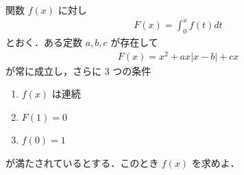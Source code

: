 \documentclass[../../main.tex]{subfiles}
\begin{document}
関数 $f(x)$ に対し
\begin{align}
  F(x) = \int_0^x f(t)dt
\end{align}
とおく．ある定数 $a, b, c$ が存在して
\begin{align}
  F(x) = x^2 + ax|x-b| + cx
\end{align}
が常に成立し，さらに $3$ つの条件
\begin{enumerate}
  \item[(i)] $f(x)$ は連続
  \item[(ii)] $F(1) = 0$
  \item[(iii)] $f(0) = 1$
\end{enumerate}
が満たされているとする．このとき $f(x)$ を求めよ．
\end{document}
